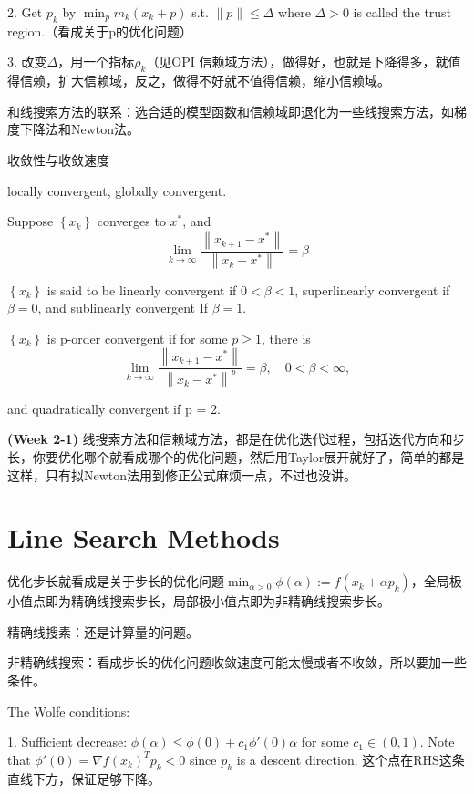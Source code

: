 2. Get $p_{k}$ by $\min_{p} m_{k}\left(x_{k}+p\right)$ s.t. $\|p\| \leq \Delta$ where  $\Delta>0$ is called the trust region.（看成关于p的优化问题）

3. 改变$\Delta$，用一个指标$\rho_k$（见OPI 信赖域方法），做得好，也就是下降得多，就值得信赖，扩大信赖域，反之，做得不好就不值得信赖，缩小信赖域。

和线搜索方法的联系：选合适的模型函数和信赖域即退化为一些线搜索方法，如梯度下降法和Newton法。

收敛性与收敛速度

locally convergent, globally convergent.

Suppose $\left\{x_{k}\right\}$ converges to $x^{\ast}$, and
\[
  \lim_{k \rightarrow \infty} \frac{\left\|x_{k+1}-x^{\ast}\right\|}{\left\|x_{k}-x^{*}\right\|}=\beta
\]

$\left\{x_{k}\right\}$ is said to be linearly convergent if $0<\beta<1$, superlinearly convergent if $\beta=0$, and sublinearly convergent If $\beta=1$.

$\left\{x_{k}\right\}$ is p-order convergent if for some $p \geq 1$, there is
\[
  \lim_{k \rightarrow \infty} \frac{\left\|x_{k+1}-x^{*}\right\|}{\left\|x_{k}-x^{*}\right\|^{p}}=\beta, \quad 0<\beta<\infty,
\]

and quadratically convergent if p = 2.

\begin{conc}
  \textbf{(Week 2-1)} 线搜索方法和信赖域方法，都是在优化迭代过程，包括迭代方向和步长，你要优化哪个就看成哪个的优化问题，然后用Taylor展开就好了，简单的都是这样，只有拟Newton法用到修正公式麻烦一点，不过也没讲。
\end{conc}

\section{Line Search Methods}

优化步长就看成是关于步长的优化问题$\min_{\alpha>0} \phi(\alpha):=f\left(x_{k}+\alpha p_{k}\right)$，全局极小值点即为精确线搜索步长，局部极小值点即为非精确线搜索步长。

精确线搜素：还是计算量的问题。

非精确线搜索：看成步长的优化问题收敛速度可能太慢或者不收敛，所以要加一些条件。

The Wolfe conditions:

1. Sufficient decrease: $\phi(\alpha) \le \phi(0) + c_1 \phi'(0) \alpha$ for some $c_1 \in (0, 1)$. Note that $\phi'(0) = \nabla f(x_k)^T p_k < 0$ since $p_k$ is a descent direction. 这个点在RHS这条直线下方，保证足够下降。

